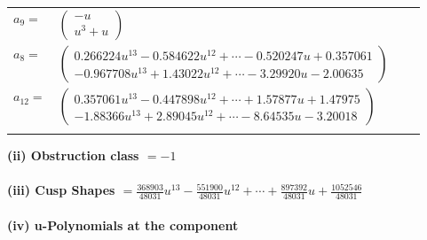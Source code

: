 \documentclass[1p]{elsarticle_modified}
\theoremstyle{definition}
\begin{document}
\begin{tabular}{m{7pt} m{180pt} m{7pt} m{180pt} }
\flushright $a_{9}=$&$\begin{pmatrix}- u\\u^3+u\end{pmatrix}$ \\
\flushright $a_{8}=$&$\begin{pmatrix}0.266224 u^{13}-0.584622 u^{12}+\cdots-0.520247 u+0.357061\\-0.967708 u^{13}+1.43022 u^{12}+\cdots-3.29920 u-2.00635\end{pmatrix}$ \\
\flushright $a_{12}=$&$\begin{pmatrix}0.357061 u^{13}-0.447898 u^{12}+\cdots+1.57877 u+1.47975\\-1.88366 u^{13}+2.89045 u^{12}+\cdots-8.64535 u-3.20018\end{pmatrix}$\\&\end{tabular}
\flushleft \textbf{(ii) Obstruction class $= -1$}\\~\\
\flushleft \textbf{(iii) Cusp Shapes $= \frac{368903}{48031} u^{13}-\frac{551900}{48031} u^{12}+\cdots+\frac{897392}{48031} u+\frac{1052546}{48031}$}\\~\\
\newpage\renewcommand{\arraystretch}{1}
\flushleft \textbf{(iv) u-Polynomials at the component}\newline \\
\end{document}
